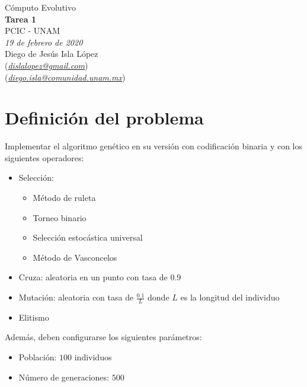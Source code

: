 \documentclass[letterpaper,12pt]{article}
\theoremstyle{definition}
\begin{document}
\begin{center}
  {\large Cómputo Evolutivo}\\
  \vspace{0.2cm}
  {\large\bfseries Tarea 1}\\
  \vspace{0.2cm}
  {\large PCIC - UNAM}\\
  \vspace{0.5cm}
  {\itshape 19 de febrero de 2020}\\
  \vspace{0.5cm}
  Diego de Jesús Isla López\\
  (\href{mailto:dislalopez@gmail.com}{\itshape dislalopez@gmail.com})\\
  (\href{mailto:diego.isla@comunidad.unam.mx}{\itshape diego.isla@comunidad.unam.mx})\\
\end{center}



\section*{Definición del problema}

Implementar el algoritmo genético en su versión con codificación binaria y con los siguientes operadores:\\

\begin{itemize}
  \item Selección:
    \begin{itemize}
      \item Método de ruleta
      \item Torneo binario
      \item Selección estocástica universal
      \item Método de Vasconcelos
    \end{itemize}
  \item Cruza: aleatoria en un punto con tasa de $0.9$
  \item Mutación: aleatoria con tasa de \(\frac{0.1}{L}\) donde \(L\) es la longitud del individuo
  \item Elitismo
\end{itemize}

\medskip

Además, deben configurarse los siguientes parámetros:\\

\begin{itemize}
  \item Población: $100$ individuos
  \item Número de generaciones: $500$
\end{itemize}
\end{document}
